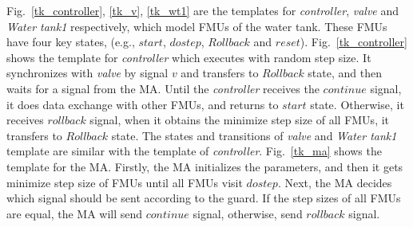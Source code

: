 \begin{figure}[htbp]
\end{figure}

Fig.~\ref{tk_controller}, \ref{tk_v}, \ref{tk_wt1} are the templates for \emph{controller}, \emph{valve} and \emph{Water tank1} respectively, which model FMUs of the water tank. These FMUs have four key states, (e.g., $start$, $dostep$, $Rollback$ and $reset$). Fig.~\ref{tk_controller} shows the template for \emph{controller} which executes with random step size. It synchronizes with \emph{valve} by signal $v$ and transfers to $Rollback$ state, and then waits for a signal from the MA. Until the \emph{controller} receives the $continue$ signal, it does data exchange with other FMUs, and returns to $start$ state. Otherwise, it receives $rollback$ signal, when it obtains the minimize step size of all FMUs, it transfers to $Rollback$ state. The states and transitions of \emph{valve} and \emph{Water tank1} template are similar with the template of \emph{controller}. Fig.~\ref{tk_ma} shows the template for the MA. Firstly, the MA initializes the parameters, and then it gets minimize step size of FMUs until all FMUs visit $dostep$. Next, the MA decides which signal should be sent according to the guard. If the step sizes of all FMUs are equal, the MA will send $continue$ signal, otherwise, send $rollback$ signal.

